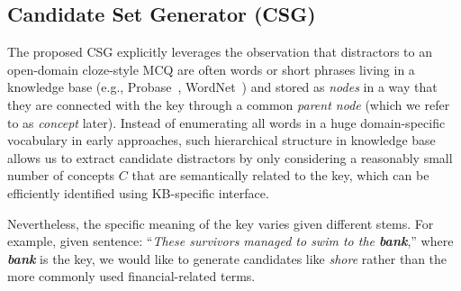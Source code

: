 \subsection{Candidate Set Generator (CSG)}
\label{sec:CSG}
The proposed CSG explicitly leverages the observation that distractors to 
an open-domain cloze-style MCQ are often words or short phrases 
living in a knowledge base (e.g., Probase~\cite{wu2012probase}, WordNet~\cite{leacock1998combining}) and stored as \textit{nodes} in a way that they are connected with the key through a common \textit{parent node} (which we refer to as \textit{concept} later). Instead of enumerating all words in a huge 
domain-specific vocabulary in early approaches, such hierarchical structure in knowledge base allows us to extract candidate distractors by only considering a reasonably small number of concepts $C$ that are semantically related to the key, 
which can be efficiently identified using KB-specific interface.


Nevertheless, the specific meaning of the key varies given different stems. For example, given sentence: ``\textit{These survivors managed to swim to the \textbf{bank}},'' where \textit{\textbf{bank}} is the key, we would like to generate candidates like \textit{shore} rather than the more commonly used 
financial-related terms.

